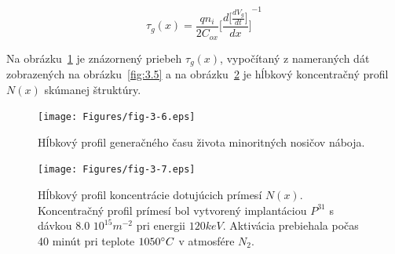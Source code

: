 \begin{equation}\label{eq:3.10}
  \tau_g(x) = \frac{qn_i}{2C_{ox}} {\Bigg[\frac{d\big[\frac{dV_g}{dt}\big]}{dx}\Bigg]}^{-1}
\end{equation}

Na obrázku~\ref{fig:3.6} je znázornený priebeh $\tau_g(x)$, vypočítaný
z nameraných dát zobrazených na obrázku~\ref{fig:3.5} a na
obrázku~\ref{fig:3.7} je hĺbkový koncentračný profil $N(x)$ skúmanej
štruktúry.

\begin{figure}[h!]\centering
  \texttt{[image: Figures/fig-3-6.eps]}
  \caption[Hĺbkový profil generačného času života minoritných nosičov
  náboja]{Hĺbkový profil generačného času života minoritných nosičov
  náboja.}\label{fig:3.6}
\end{figure}

\begin{figure}[h!]\centering
  \texttt{[image: Figures/fig-3-7.eps]}
  \caption[Hĺbkový profil koncentrácie dotujúcich prímesí
  $N(x)$]{Hĺbkový profil koncentrácie dotujúcich prímesí
  $N(x)$. Koncentračný profil prímesí bol vytvorený implantáciou
  $P^{31}$ s dávkou $8.0$ $10^{15}m^{-2}$ pri energii $120 keV$.
  Aktivácia prebiehala počas 40 minút pri teplote $1050 \degree C$ v
  atmosfére $N_2$.}\label{fig:3.7}
\end{figure}


